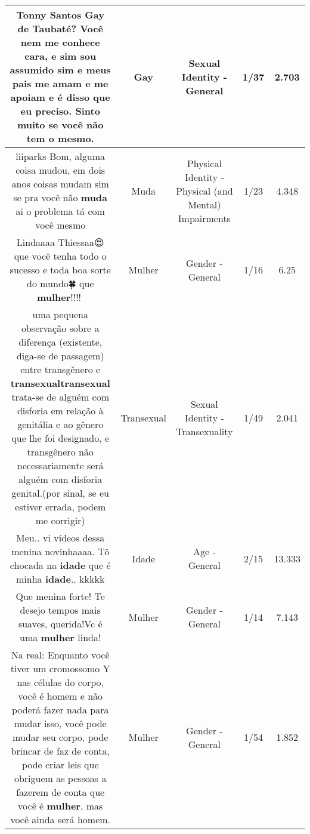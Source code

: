 \documentclass[11pt]{article}
\newlength\mylength
\begin{document}
\begin{center}
\begin{longtable}{|C{.65\mylength}|C{.30\mylength}|C{.12\mylength}|C{.12\mylength}|C{.12\mylength}|}
  \small Tonny Santos \textbf{Gay} de Taubaté? Você nem me conhece cara, e sim sou assumido sim e meus pais me amam e me apoiam e é disso que eu preciso. Sinto muito se você não tem o mesmo.\normalsize   & Gay & Sexual Identity - General & 1/37 & 2.703 \\  \hline
  \small liiparks Bom, alguma coisa mudou, em dois anos coisas mudam sim se pra você não \textbf{muda} ai o problema tá com você mesmo\normalsize   & Muda & Physical Identity - Physical (and Mental) Impairments & 1/23 & 4.348 \\  \hline
  \small Lindaaaa Thiessaa😍 que você tenha todo o sucesso e toda boa sorte do mundo🍀 que \textbf{mulher}!!!!🌹\normalsize   & Mulher & Gender - General & 1/16 & 6.25 \\  \hline
  \small uma pequena observação sobre a diferença (existente, diga-se de passagem) entre transgênero e \textbf{transexual}\textbf{transexual} trata-se de alguém com disforia em relação à genitália e ao gênero que lhe foi designado, e transgênero não necessariamente será alguém com disforia genital.(por sinal, se eu estiver errada, podem me corrigir)\normalsize   & Transexual & Sexual Identity - Transexuality & 1/49 & 2.041 \\  \hline
  \small Meu.. vi vídeos dessa menina novinhaaaa. Tô chocada na \textbf{idade} que é minha \textbf{idade}.. kkkkk\normalsize   & Idade & Age - General & 2/15 & 13.333 \\  \hline
  \small Que menina forte! Te desejo tempos mais suaves, querida!Vc é uma \textbf{mulher} linda!\normalsize   & Mulher & Gender - General & 1/14 & 7.143 \\  \hline
  \small Na real: Enquanto você tiver um cromossomo Y nas células do corpo, você é homem e não poderá fazer nada para mudar isso, você pode mudar seu corpo, pode brincar de faz de conta, pode criar leis que obriguem as pessoas a fazerem de conta que você é \textbf{mulher}, mas você ainda será homem.\normalsize   & Mulher & Gender - General & 1/54 & 1.852 \\  \hline

\end{longtable}
\end{center}
\end{document}
